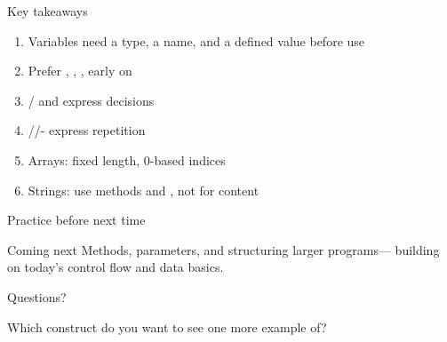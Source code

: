 \documentclass[aspectratio=169,11pt]{beamer}
\begin{document}
    \begin{frame}{Key takeaways}
        \begin{enumerate}
            \item Variables need a type, a name, and a defined value before use
            \item Prefer , , ,  early on
            \item {}/ and  express decisions
            \item {}//- express repetition
            \item Arrays: fixed length, 0-based indices
            \item Strings: use methods and , not \javacode{==} for content
        \end{enumerate}
    \end{frame}

    \begin{frame}{Practice before next time}
        \vspace{0.6em}
        \begin{block}{Coming next}
            Methods, parameters, and structuring larger programs---
            building on today's control flow and data basics.
        \end{block}
    \end{frame}

    \begin{frame}{Questions?}
        \begin{center}
            {\Large Which construct do you want to see one more example of?}
        \end{center}
    \end{frame}
\end{document}
